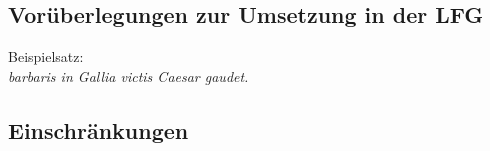 \documentclass[12pt,a4paper]{article}
\begin{document}
\subsection{Vorüberlegungen zur Umsetzung in der LFG}
Beispielsatz: \\
\textit{barbaris in Gallia victis Caesar gaudet.} \\

 

\subsection{Einschränkungen}

\end{document}
